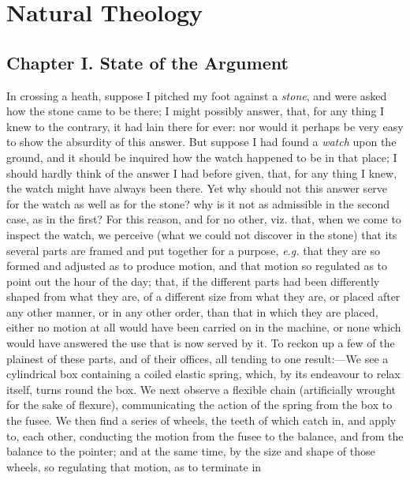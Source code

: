 
\author{William Paley}
\chapter[Natural Theology, chaps. 1 and 2]{Natural Theology}

\section{Chapter I. State of the Argument}

In crossing a heath, suppose I pitched my foot against a
\textit{stone}, and were asked how the stone came to be there; I might
possibly answer, that, for any thing I knew to the contrary, it had
lain there for ever: nor would it perhaps be very easy to show the
absurdity of this answer. But suppose I had found a \textit{watch}
upon the ground, and it should be inquired how the watch happened to
be in that place; I should hardly think of the answer I had before
given, that, for any thing I knew, the watch might have always been
there. Yet why should not this answer serve for the watch as well as
for the stone? why is it not as admissible in the second case, as in
the first? For this reason,  and for no other, viz. that, when
we come to inspect the watch, we perceive (what we could not discover
in the stone) that its several parts are framed and put together for a
purpose, \textit{e.g.} that they are so formed and adjusted as to
produce motion, and that motion so regulated as to point out the hour
of the day; that, if the different parts had been differently shaped
from what they are, of a different size from what they are, or placed
after any other manner, or in any other order, than that in which they
are placed, either no motion at all would have been carried on in the
machine, or none which would have answered the use that is now served
by it. To reckon up a few of the plainest of these parts, and of their
offices, all tending to one re\-sult:---We see a cylindrical box
containing a coiled elastic spring, which, by its endeavour to relax
itself, turns round the box. We next observe a flexible chain
(artificially wrought for the sake of flexure), communicating the
action of the spring from the box to the fusee. We then find a series
of wheels, the teeth of which catch in, and apply to, each other,
conducting the motion from the fusee to the balance, and from the
balance to the pointer; and at the same time, by the  size and
shape of those wheels, so regulating that motion, as to terminate in
